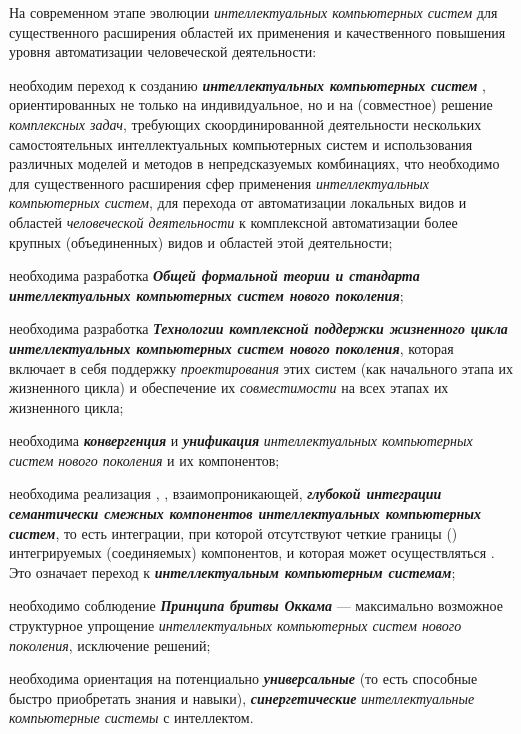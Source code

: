 На современном этапе эволюции \textit{интеллектуальных компьютерных систем} для существенного расширения областей их применения и качественного повышения уровня автоматизации человеческой деятельности:
\begin{textitemize}
	\item
	необходим переход к созданию   \textbf{\textit{интеллектуальных компьютерных систем }}, ориентированных не только на индивидуальное, но и на  (совместное) решение \textit{комплексных задач}, требующих скоординированной деятельности нескольких самостоятельных интеллектуальных компьютерных систем и использования различных моделей и методов в непредсказуемых комбинациях, что необходимо для существенного расширения сфер применения \textit{интеллектуальных компьютерных систем}, для перехода от автоматизации локальных видов и областей \textit{человеческой деятельности} к комплексной автоматизации более крупных (объединенных) видов и областей этой деятельности;
	\item
	необходима разработка \textbf{\textit{Общей формальной теории и стандарта интеллектуальных компьютерных систем нового поколения}};
	\item
	необходима разработка \textbf{\textit{Технологии комплексной поддержки жизненного цикла интеллектуальных компьютерных систем нового поколения}}, которая включает в себя поддержку \textit{проектирования} этих систем (как начального этапа их жизненного цикла) и обеспечение их \textit{совместимости} на всех этапах их жизненного цикла;
	\item
	необходима \textbf{\textit{конвергенция}} и \textbf{\textit{унификация}} \textit{интеллектуальных компьютерных систем нового поколения} и их компонентов;
	\item
	необходима реализация , , взаимопроникающей, \textbf{\textit{глубокой интеграции семантически смежных компонентов интеллектуальных компьютерных систем}}, то есть интеграции, при которой отсутствуют четкие границы () интегрируемых (соединяемых) компонентов, и которая может осуществляться . Это означает переход к \textbf{\textit{ интеллектуальным компьютерным системам}};
	\item
	необходимо соблюдение \textbf{\textit{Принципа бритвы Оккама}} --- максимально возможное структурное упрощение \textit{интеллектуальных компьютерных систем нового поколения}, исключение  решений;
	\item
	необходима ориентация на потенциально \textbf{\textit{универсальные}} (то есть способные быстро приобретать  знания и навыки), \textbf{\textit{синергетические}} \textit{интеллектуальные компьютерные системы} с  интеллектом.
\end{textitemize}

